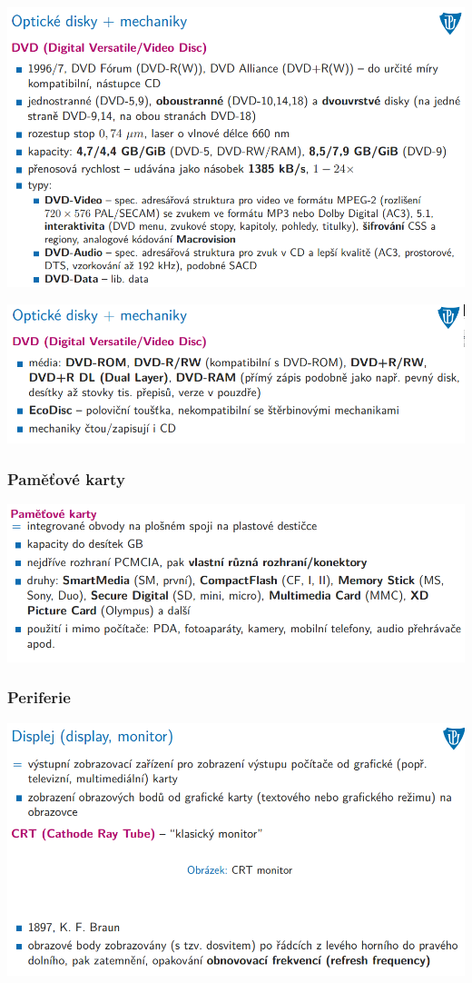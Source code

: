 \documentclass[10pt,a4paper]{article}
\begin{document}
\includegraphics[scale=0.65]{img/prvni_odstavec/otazka7/opticke_disky4.png}

\includegraphics[scale=0.65]{img/prvni_odstavec/otazka7/opticke_disky5.png}


\subsubsection{Paměťové karty}
\includegraphics[scale=0.65]{img/prvni_odstavec/otazka7/pametove_karty.png}

\subsubsection{Periferie}
\includegraphics[scale=0.65]{img/prvni_odstavec/otazka7/periferie1.png}
\end{document}
